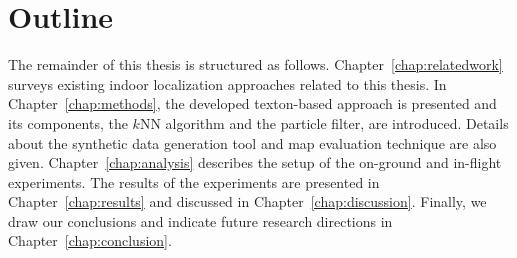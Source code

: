 \section{Outline}
\label{sec:outline}

The remainder of this thesis is structured as follows.
Chapter~\ref{chap:relatedwork} surveys existing indoor localization
approaches related to this thesis. In Chapter~\ref{chap:methods}, the
developed texton-based approach is presented and its components, the
$k$NN algorithm and the particle filter, are introduced. Details about
the synthetic data generation tool and map evaluation technique are
also given. Chapter~\ref{chap:analysis} describes the setup of the
on-ground and in-flight experiments. The results of the experiments
are presented in Chapter~\ref{chap:results} and discussed in
Chapter~\ref{chap:discussion}. Finally, we draw our conclusions and
indicate future research directions in Chapter~\ref{chap:conclusion}.